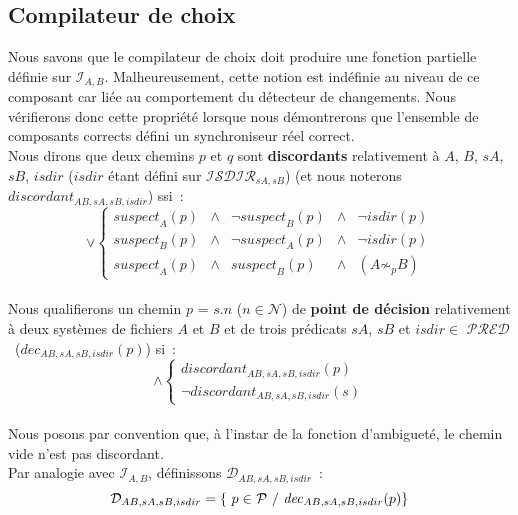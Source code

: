 \documentclass[11pt]{report}
\newcommand{\pred}{\ensuremath{\mathcal{PRED}}}
\newcommand{\path}{\ensuremath{\mathcal{P}}}
\newcommand{\infl}[2]{\ensuremath{\mathcal{I}_{#1,#2}}}
\newcommand{\sus}[1]{\ensuremath{\mathit{suspect}_{#1}}}
\newcommand{\isdir}[2]{\ensuremath{\mathcal{ISDIR}_{#1,#2}}}
\begin{document}
{\subsection{Compilateur de choix}
Nous savons que le compilateur de choix doit produire une fonction partielle d\'efinie sur
\infl{A}{B}. Malheureusement, cette notion est ind\'efinie au niveau de ce composant car
li\'ee au comportement du d\'etecteur de changements. Nous v\'erifierons donc cette propri\'et\'e
lorsque nous d\'emontrerons que l'ensemble de composants corrects d\'efini un synchroniseur r\'eel
correct.\\
Nous dirons que deux chemins $p$ et $q$ sont \textbf{discordants} relativement \`a $A$, $B$, 
$sA$, $sB$, $\mathit{isdir}$ ($\mathit{isdir}$ \'etant d\'efini sur \isdir{sA}{sB})
(et nous noterons $\mathit{discordant}_{AB,sA,sB,isdir}$) ssi~:\\
\begin{displaymath}
\vee 
 \left\{ 
  \begin{array}{lllll}
   \sus{A}(p) & \wedge & \neg \sus{B}(p) & \wedge & \neg \mathit{isdir}(p) \\
   \sus{B}(p) & \wedge & \neg \sus{A}(p) & \wedge & \neg \mathit{isdir}(p) \\
   \sus{A}(p) & \wedge & \sus{B}(p) & \wedge & (A \not\sim_{p} B)
  \end{array} 
 \right. 
\end{displaymath}\\
Nous qualifierons un chemin $p$ = $s.n$ ($n \in \mathcal{N}$) de 
\textbf{point de d\'ecision} relativement \`a deux syst\`emes de fichiers 
$A$ et $B$ et de trois pr\'edicats $sA$, $sB$ et $\mathit{isdir} \in$ \pred\ 
(\emph{$\mathit{dec}_{AB,sA,sB,isdir}(p)$}) si~:
\begin{displaymath}\label{eq:dec}
\wedge \left\{ \begin{array}{ll}
 \mathit{discordant}_{AB,sA,sB,isdir}(p)\\ 
 \neg \mathit{discordant}_{AB,sA,sB,isdir}(s)
\end{array}
\right.
\end{displaymath}\\
Nous posons par convention que, \`a l'instar de la fonction d'ambiguet\'e,
 le chemin vide n'est pas discordant.\\
Par analogie avec \infl{A}{B}, d\'efinissons $\mathcal{D}_{AB,sA,sB,isdir}$~:
\begin{equation}
\mathcal{D}_{AB,sA,sB,isdir} = \{ \mbox{\ $p \in$ \path\ / 
$\mathit{dec}_{AB,sA,sB,isdir}(p)$} \}

\end{equation}}
\end{document}
